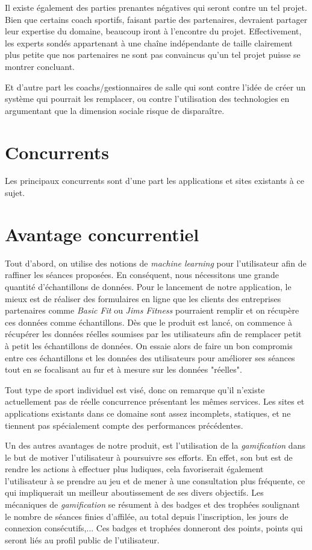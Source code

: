 Il existe également des parties prenantes négatives qui seront contre un tel projet. Bien que certains coach sportifs, faisant partie des partenaires, devraient partager leur expertise du domaine, beaucoup iront à l'encontre du projet. Effectivement, les experts sondés appartenant à une chaîne indépendante de taille clairement plus petite que nos partenaires ne sont pas convaincus qu'un tel projet puisse se montrer concluant. 

Et d'autre part les coachs/gestionnaires de salle qui sont contre l'idée de créer un système qui pourrait les remplacer, ou contre l'utilisation des technologies en argumentant que la dimension sociale risque de disparaître. 

\section{Concurrents}

Les principaux concurrents sont d'une part les applications et sites existants à ce sujet. 

\section{Avantage concurrentiel}

Tout d'abord, on utilise des notions de \textit{machine learning} pour l'utilisateur afin de raffiner les séances proposées. En conséquent,  nous nécessitons une grande quantité d'échantillons de données. Pour le lancement de notre application, le mieux est de réaliser des formulaires en ligne que les clients des entreprises partenaires comme \textit{Basic Fit} ou \textit{Jims Fitness} pourraient remplir et on récupère ces données comme échantillons. Dès que le produit est lancé, on commence à récupérer les données réelles soumises par les utilisateurs afin de remplacer petit à petit les échantillons de données. On essaie alors de faire un bon compromis entre ces échantillons et les données des utilisateurs pour améliorer ses séances tout en se focalisant au fur et à mesure sur les données "réelles".

Tout type de sport individuel est visé, donc on remarque qu'il n'existe actuellement pas de réelle concurrence présentant les mêmes services. Les sites et applications existants dans ce domaine sont assez incomplets, statiques, et ne tiennent pas spécialement compte des performances précédentes. 

Un des autres avantages de notre produit, est l'utilisation de la \textit{gamification} dans le but de motiver l'utilisateur à poursuivre ses efforts. En effet, son but est de rendre les actions à effectuer plus ludiques, cela favoriserait également l'utilisateur à se prendre au jeu et de mener à une consultation plus fréquente, ce qui impliquerait un meilleur aboutissement de ses divers objectifs. Les mécaniques de \textit{gamification} se résument à des badges et des trophées soulignant le nombre de séances finies d'affilée, au total depuis l'inscription, les jours de connexion consécutifs,... Ces badges et trophées donneront des points, points qui seront liés au profil public de l'utilisateur.
